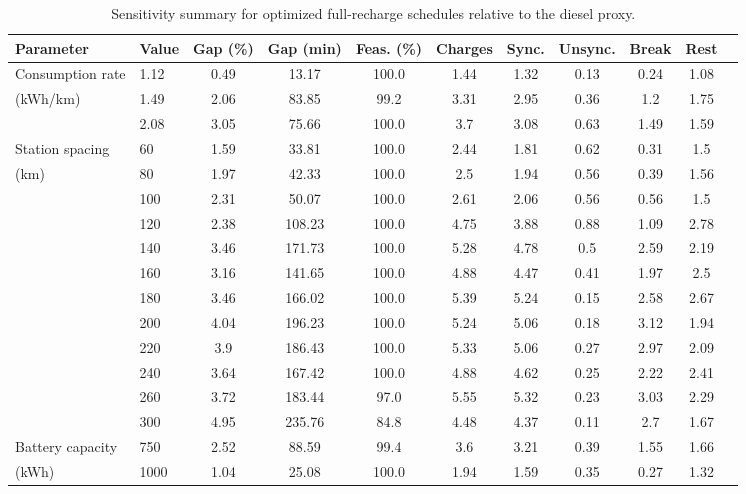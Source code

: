 \begin{table}[t]
\centering
\caption{Sensitivity summary for optimized full-recharge schedules relative to the diesel proxy.}
\label{tab:sensitivity_full_diesel}
\begin{threeparttable}
\small
\setlength{\tabcolsep}{3.5pt}
\renewcommand{\arraystretch}{1.1}
\begin{tabular}{
ll
S[table-format=1.2]
S[table-format=3.0]
S[table-format=3.1]
S[table-format=1.2]
S[table-format=1.2]
S[table-format=1.2]
S[table-format=1.2]
S[table-format=1.2]
S[table-format=1.2]
}
\toprule
Parameter & Value & {Gap (\%)} & {Gap (min)} & {Feas. (\%)} & {Charges} & {Sync.} & {Unsync.} & {Break} & {Rest} \\
\midrule
Consumption rate & 1.12 & 0.49 & 13.17 & 100.0 & 1.44 & 1.32 & 0.13 & 0.24 & 1.08 \\
(kWh/km) & 1.49 & 2.06 & 83.85 & 99.2 & 3.31 & 2.95 & 0.36 & 1.2 & 1.75 \\
 & 2.08 & 3.05 & 75.66 & 100.0 & 3.7 & 3.08 & 0.63 & 1.49 & 1.59 \\
\addlinespace
Station spacing & 60 & 1.59 & 33.81 & 100.0 & 2.44 & 1.81 & 0.62 & 0.31 & 1.5 \\
(km) & 80 & 1.97 & 42.33 & 100.0 & 2.5 & 1.94 & 0.56 & 0.39 & 1.56 \\
 & 100 & 2.31 & 50.07 & 100.0 & 2.61 & 2.06 & 0.56 & 0.56 & 1.5 \\
 & 120 & 2.38 & 108.23 & 100.0 & 4.75 & 3.88 & 0.88 & 1.09 & 2.78 \\
 & 140 & 3.46 & 171.73 & 100.0 & 5.28 & 4.78 & 0.5 & 2.59 & 2.19 \\
 & 160 & 3.16 & 141.65 & 100.0 & 4.88 & 4.47 & 0.41 & 1.97 & 2.5 \\
 & 180 & 3.46 & 166.02 & 100.0 & 5.39 & 5.24 & 0.15 & 2.58 & 2.67 \\
 & 200 & 4.04 & 196.23 & 100.0 & 5.24 & 5.06 & 0.18 & 3.12 & 1.94 \\
 & 220 & 3.9 & 186.43 & 100.0 & 5.33 & 5.06 & 0.27 & 2.97 & 2.09 \\
 & 240 & 3.64 & 167.42 & 100.0 & 4.88 & 4.62 & 0.25 & 2.22 & 2.41 \\
 & 260 & 3.72 & 183.44 & 97.0 & 5.55 & 5.32 & 0.23 & 3.03 & 2.29 \\
 & 300 & 4.95 & 235.76 & 84.8 & 4.48 & 4.37 & 0.11 & 2.7 & 1.67 \\
\addlinespace
Battery capacity & 750 & 2.52 & 88.59 & 99.4 & 3.6 & 3.21 & 0.39 & 1.55 & 1.66 \\
(kWh) & 1000 & 1.04 & 25.08 & 100.0 & 1.94 & 1.59 & 0.35 & 0.27 & 1.32 \\

\end{tabular}
\end{threeparttable}
\end{table}
